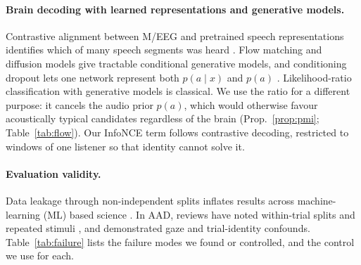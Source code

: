 \documentclass[twoside]{article}
\begin{document}
\paragraph{Brain decoding with learned representations and generative models.}
Contrastive alignment between M/EEG and pretrained speech representations identifies
which of many speech segments was heard \citep{defossez2023decoding}. Flow matching
\citep{lipman2023flow} and diffusion models give tractable conditional generative models,
and conditioning dropout lets one network represent both $p(a\mid x)$ and $p(a)$
\citep{ho2022classifierfree}. Likelihood-ratio classification with generative models is
classical. We use the ratio for a different purpose: it cancels the audio prior $p(a)$,
which would otherwise favour acoustically typical candidates regardless of the brain
(Prop.~\ref{prop:pmi}; Table~\ref{tab:flow}). Our InfoNCE term follows contrastive
decoding, restricted to windows of one listener so that identity cannot solve it.

\paragraph{Evaluation validity.} Data leakage through non-independent splits inflates
results across machine-learning (ML) based science \citep{kapoor2023leakage}. In AAD, reviews have noted
within-trial splits and repeated stimuli \citep{puffay2023relating}, and
\citet{rotaru2024what} demonstrated gaze and trial-identity confounds. Table~\ref{tab:failure}
lists the failure modes we found or controlled, and the control we use for each.
\end{document}
